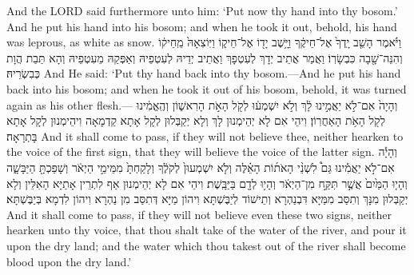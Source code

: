 {{And the LORD said furthermore unto him: ‘Put now thy hand into thy bosom.’ And he put his hand into his bosom; and when he took it out, behold, his hand was leprous, as white as snow.}{}
{וַיֹּ֗אמֶר הָשֵׁ֤ב יָֽדְךָ֙ אֶל־חֵיקֶ֔ךָ וַיָּ֥שֶׁב יָד֖וֹ אֶל־חֵיק֑וֹ וַיּֽוֹצִאָהּ֙ מֵֽחֵיק֔וֹ וְהִנֵּה־שָׁ֖בָה כִּבְשָׂרֽוֹ׃
}
{וַאֲמַר אֲתֵיב יְדָךְ לְעִטְפָךְ וַאֲתֵיב יְדֵיהּ לְעִטְפֵיהּ וְאַפְּקַהּ מֵעִטְפֵיהּ וְהָא תַּבַת הֲוָת כְּבִשְׂרֵיהּ׃}
{And He said: ‘Put thy hand back into thy bosom.—And he put his hand back into his bosom; and when he took it out of his bosom, behold, it was turned again as his other flesh.—}{}
{וְהָיָה֙ אִם־לֹ֣א יַאֲמִ֣ינוּ לָ֔ךְ וְלֹ֣א יִשְׁמְע֔וּ לְקֹ֖ל הָאֹ֣ת הָרִאשׁ֑וֹן וְהֶֽאֱמִ֔ינוּ לְקֹ֖ל הָאֹ֥ת הָאַחֲרֽוֹן׃
}
{וִיהֵי אִם לָא יְהֵימְנוּן לָךְ וְלָא יְקַבְּלוּן לְקָל אָתָא קַדְמָאָה וִיהֵימְנוּן לְקָל אָתָא בָּתְרָאָה׃}
{And it shall come to pass, if they will not believe thee, neither hearken to the voice of the first sign, that they will believe the voice of the latter sign.}{}
{וְהָיָ֡ה אִם־לֹ֣א יַאֲמִ֡ינוּ גַּם֩ לִשְׁנֵ֨י הָאֹת֜וֹת הָאֵ֗לֶּה וְלֹ֤א יִשְׁמְעוּן֙ לְקֹלֶ֔ךָ וְלָקַחְתָּ֙ מִמֵּימֵ֣י הַיְאֹ֔ר וְשָׁפַכְתָּ֖ הַיַּבָּשָׁ֑ה וְהָי֤וּ הַמַּ֙יִם֙ אֲשֶׁ֣ר תִּקַּ֣ח מִן־הַיְאֹ֔ר וְהָי֥וּ לְדָ֖ם בַּיַּבָּֽשֶׁת׃
}
{וִיהֵי אִם לָא יְהֵימְנוּן אַף לִתְרֵין אָתַיָּא הָאִלֵּין וְלָא יְקַבְּלוּן מִנָּךְ וְתִסַּב מִמַּיָּא דִּבְנַהְרָא וְתֵישׁוֹד לְיַבֶּשְׁתָּא וִיהוֹן מַיָּא דְּתִסַּב מִן נַהְרָא וִיהוֹן לִדְמָא בְּיַבֶּשְׁתָּא׃}
{And it shall come to pass, if they will not believe even these two signs, neither hearken unto thy voice, that thou shalt take of the water of the river, and pour it upon the dry land; and the water which thou takest out of the river shall become blood upon the dry land.’}{}
}
